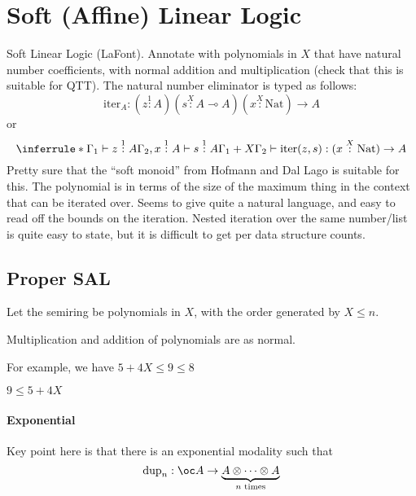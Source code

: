 \documentclass{workingnote}
\begin{document}
\section{Soft (Affine) Linear Logic}
\label{sec:soft-ll}

Soft Linear Logic (LaFont). Annotate with polynomials in $X$ that have
natural number coefficients, with normal addition and multiplication
(check that this is suitable for QTT). The natural number eliminator
is typed as follows:
\begin{displaymath}
  \mathrm{iter}_A : (z \stackrel{1}: A)(s \stackrel{X}: A \multimap A)(x \stackrel{X}: \mathrm{Nat}) \to A
\end{displaymath}
or
\begin{displaymath}
  \inferrule*
  {\Gamma_1 \vdash z \stackrel{1}: A \\
    \Gamma_2, x \stackrel1: A \vdash s \stackrel1: A}
  {\Gamma_1+X\Gamma_2 \vdash \mathrm{iter}(z,s) : (x \stackrel{X}: \mathrm{Nat}) \to A}
\end{displaymath}
Pretty sure that the ``soft monoid'' from Hofmann and Dal Lago is
suitable for this. The polynomial is in terms of the size of the
maximum thing in the context that can be iterated over. Seems to give
quite a natural language, and easy to read off the bounds on the
iteration. Nested iteration over the same number/list is quite easy to
state, but it is difficult to get per data structure counts.


\subsection{Proper SAL}

Let the semiring be polynomials in $X$, with the order generated by
$X \leq n$.

Multiplication and addition of polynomials are as normal.

For example, we have $5 + 4X \leq 9 \leq 8$

$9 \leq 5 + 4X$



\paragraph{Exponential}
Key point here is that there is an exponential modality such that
\begin{displaymath}
  \mathrm{dup}_n : \oc A \to \underbrace{A \otimes \cdots \otimes A}_{n \textrm{ times}}
\end{displaymath}
\end{document}
